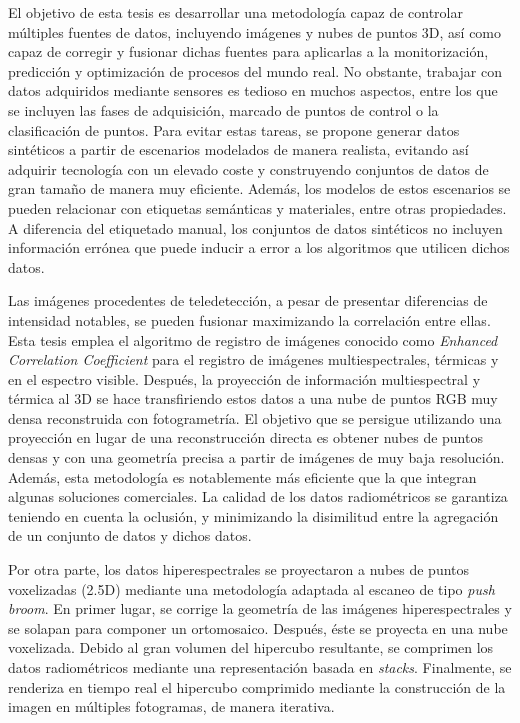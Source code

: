 \newpage
{}

\normalsize
\libertineNormal

El objetivo de esta tesis es desarrollar una metodología capaz de controlar múltiples fuentes de datos, incluyendo imágenes y nubes de puntos 3D, así como capaz de corregir y fusionar dichas fuentes para aplicarlas a la monitorización, predicción y optimización de procesos del mundo real. No obstante, trabajar con datos adquiridos mediante sensores es tedioso en muchos aspectos, entre los que se incluyen las fases de adquisición, marcado de puntos de control o la clasificación de puntos. Para evitar estas tareas, se propone generar datos sintéticos a partir de escenarios modelados de manera realista, evitando así adquirir tecnología con un elevado coste y construyendo conjuntos de datos de gran tamaño de manera muy eficiente. Además, los modelos de estos escenarios se pueden relacionar con etiquetas semánticas y materiales, entre otras propiedades. A diferencia del etiquetado manual, los conjuntos de datos sintéticos no incluyen información errónea que puede inducir a error a los algoritmos que utilicen dichos datos.

Las imágenes procedentes de teledetección, a pesar de presentar diferencias de intensidad notables, se pueden fusionar maximizando la correlación entre ellas. Esta tesis emplea el algoritmo de registro de imágenes conocido como \textit{Enhanced Correlation Coefficient} para el registro de imágenes multiespectrales, térmicas y en el espectro visible. Después, la proyección de información multiespectral y térmica al 3D se hace transfiriendo estos datos a una nube de puntos RGB muy densa reconstruida con fotogrametría. El objetivo que se persigue utilizando una proyección en lugar de una reconstrucción directa es obtener nubes de puntos densas y con una geometría precisa a partir de imágenes de muy baja resolución. Además, esta metodología es notablemente más eficiente que la que integran algunas soluciones comerciales. La calidad de los datos radiométricos se garantiza teniendo en cuenta la oclusión, y minimizando la disimilitud entre la agregación de un conjunto de datos y dichos datos.

Por otra parte, los datos hiperespectrales se proyectaron a nubes de puntos voxelizadas (2.5D) mediante una metodología adaptada al escaneo de tipo \textit{push broom}. En primer lugar, se corrige la geometría de las imágenes hiperespectrales y se solapan para componer un ortomosaico. Después, éste se proyecta en una nube voxelizada. Debido al gran volumen del hipercubo resultante, se comprimen los datos radiométricos mediante una representación basada en \textit{stacks}. Finalmente, se renderiza en tiempo real el hipercubo comprimido mediante la construcción de la imagen en múltiples fotogramas, de manera iterativa.
 
